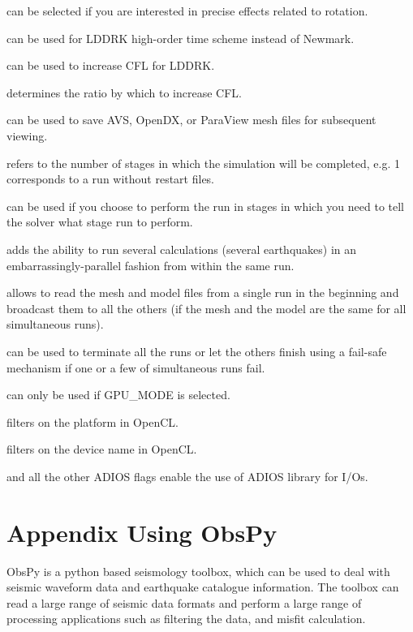 \documentclass[english]{book}
\begin{document}
 can be selected if you are
interested in precise effects related to rotation.

 can be used for LDDRK high-order time scheme instead of
Newmark.

 can be used to increase CFL for LDDRK.

 determines the ratio by which to
increase CFL.

 can be used to save AVS, OpenDX, or ParaView mesh
files for subsequent viewing.

 refers to the number of stages in which the
simulation will be completed, e.g. 1 corresponds to a run without
restart files.

 can be used if you choose to perform the run
in stages in which you need to tell the solver what stage run to
perform.

 adds the ability to run several
calculations (several earthquakes) in an embarrassingly-parallel fashion
from within the same run.

 allows to read the mesh and model
files from a single run in the beginning and broadcast them to all the
others (if the mesh and the model are the same for all simultaneous
runs).

 can be used to terminate all the runs or
let the others finish using a fail-safe mechanism if one or a few of
simultaneous runs fail.

 can only be used if GPU\_MODE is selected.

 filters on the platform in OpenCL.

 filters on the device name in OpenCL.

 and all the other ADIOS flags enable the use of ADIOS
library for I/Os.


\chapter{Appendix  \textendash{} Using ObsPy}
\label{\detokenize{Appendix3::doc}}\label{\detokenize{Appendix3:appendix-3-using-obspy}}
ObsPy is a python based seismology toolbox, which can be used to deal
with seismic waveform data and earthquake catalogue information. The
toolbox can read a large range of seismic data formats and perform a
large range of processing applications such as filtering the data, and
misfit calculation.
\end{document}
